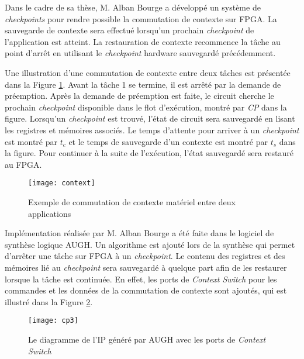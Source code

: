 Dans le cadre de sa thèse, M. Alban Bourge a développé un système de \emph{checkpoints} pour rendre possible
la commutation de contexte sur FPGA. La sauvegarde de contexte sera effectué lorsqu'un prochain \emph{checkpoint}
de l'application est atteint. La restauration de contexte recommence la tâche au point d'arrêt en utilisant
le \emph{checkpoint} hardware sauvegardé précédemment. 

Une illustration d'une commutation de contexte entre deux tâches est présentée
dans la Figure \ref{fig:switch}. Avant la tâche 1 se termine, il est arrêté par la demande de préemption.
Après la demande de préemption est faite, le circuit cherche le prochain \emph{checkpoint}
disponible dans le flot d'exécution, montré par \emph{CP} dans la figure. Lorsqu'un \emph{checkpoint}
est trouvé, l'état de circuit sera sauvegardé en lisant les registres et mémoires associés.
Le temps d'attente pour arriver à un \emph{checkpoint} est montré par $t_c$ et le temps
de sauvegarde d'un contexte est montré par $t_s$ dans la figure. Pour continuer à la suite de l'exécution,
l'état sauvegardé sera restauré au FPGA.

\begin{figure}[h]
	\centering
	\texttt{[image: context]}
	\caption{Exemple de commutation de contexte matériel entre deux applications\cite{Bourge2015}}
	\label{fig:switch}
	\vspace{-2mm}
\end{figure}

Implémentation réalisée par M. Alban Bourge a été faite dans le logiciel de synthèse logique AUGH.
Un algorithme est ajouté lors de la synthèse qui permet d'arrêter une tâche sur FPGA à un \emph{checkpoint}.
Le contenu des registres et des mémoires lié au \emph{checkpoint} sera sauvegardé à quelque part
afin de les restaurer lorsque la tâche est continuée. En effet, les ports de \emph{Context Switch} pour les
commandes et les données de la commutation de contexte sont ajoutés, qui est illustré dans la Figure \ref{fig:cp3}.

\begin{figure}[h]
	\centering
	\texttt{[image: cp3]}
	\caption{Le diagramme de l'IP généré par AUGH avec les ports de \emph{Context Switch}}
	\label{fig:cp3}
	\vspace{-2mm}
\end{figure}
